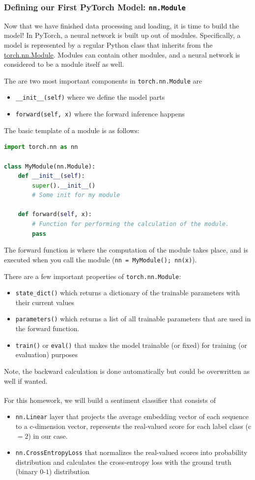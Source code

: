 \documentclass{article}
\begin{document}
\subsubsection{Defining our First PyTorch Model: \texttt{nn.Module}}
\noindent Now that we have finished data processing and loading, it is time to build the model! In PyTorch, a neural network is built up out of modules. 
Specifically, a model is represented by a regular Python class that inherits from the \href{https://pytorch.org/docs/stable/generated/torch.nn.Module.html}{torch.nn.Module}.
Modules can contain other modules, and a neural network is considered to be a module itself as well. 

\noindent The are two most important components in \texttt{torch.nn.Module} are
\begin{itemize}
    \item \texttt{\_\_init\_\_(self)} where we define the model parts
    \item \texttt{forward(self, x)} where the forward inference happens
\end{itemize}
The basic template of a module is as follows:
\begin{lstlisting}[language=Python]
import torch.nn as nn

class MyModule(nn.Module):
    def __init__(self):
        super().__init__()
        # Some init for my module
        
    def forward(self, x):
        # Function for performing the calculation of the module.
        pass
\end{lstlisting}

The forward function is where the computation of the module takes place, and is executed when you call the module (\texttt{nn = MyModule(); nn(x)}).

There are a few important properties of \texttt{torch.nn.Module}:
\begin{itemize}
    \item \texttt{state\_dict()} which returns a dictionary of the trainable parameters with their current values
    \item \texttt{parameters()} which returns a list of all trainable parameters that are used in the forward function.
    \item \texttt{train()} or \texttt{eval()} that makes the model trainable (or fixed) for training (or evaluation) purposes
\end{itemize} 
Note, the backward calculation is done automatically but could be overwritten as well if wanted.
\\\\
For this homework, we will build a sentiment classifier that consists of
\begin{itemize}
    \item \texttt{nn.Linear} layer that projects the average embedding vector of each sequence to a c-dimension vector, represents the real-valued score for each label class (c $ =2$) in our case.
    \item \texttt{nn.CrossEntropyLoss} that normalizes the real-valued scores into probability distribution and calculates the cross-entropy loss with the ground truth (binary $0$-$1$) distribution 
\end{itemize}
\end{document}
